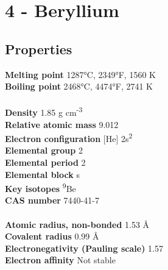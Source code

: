 \section{4 - Beryllium}
\label{sec:elem-beryllium}
\subsection{Properties}
\textbf{Melting point} 1287°C, 2349°F, 1560 K\\
\textbf{Boiling point} 2468°C, 4474°F, 2741 K\\
\\
\textbf{Density} 1.85 g cm\textsuperscript{-3}\\
\textbf{Relative atomic mass} 9.012\\
\textbf{Electron configuration} [He] 2s\textsuperscript{2}\\
\textbf{Elemental group} 2\\
\textbf{Elemental period} 2\\
\textbf{Elemental block} s\\
\textbf{Key isotopes} \textsuperscript{9}Be\\
\textbf{CAS number} 7440-41-7\\
\\
\textbf{Atomic radius, non-bonded} 1.53 Å\\
\textbf{Covalent radius} 0.99 Å\\
\textbf{Electronegativity (Pauling scale)} 1.57\\
\textbf{Electron affinity} Not stable\\